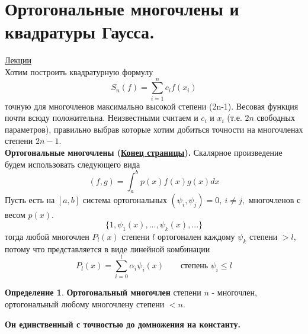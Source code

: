 \documentclass[specialist, subf, href, colorlinks=true, 12pt, times, mtpro, final]{disser}
\theoremstyle{definition}
\newtheorem{defn}{Определение}[section]
\begin{document}
\section {Ортогональные многочлены и квадратуры Гаусса.}
    \hyperlink {lects.40}{Лекции}\\
    Хотим построить квадратурную формулу
    $$
        S_n(f) = \sum\limits_{i = 1}^n c_i f(x_i)
    $$ 
    точную для многочленов максимально высокой степени (2n-1). Весовая функция почти всюду положительна. Неизвестными считаем и $c_i$ и  $x_i$ (т.е. $2n$ свободных параметров), правильно выбрав которые хотим добиться точности на многочленах степени $2n-1$. \\
    \textbf{Ортогональные многочлены (\hyperlink {lects.40}{Конец страницы}).}
    Скалярное произведение будем использовать следующего вида
    $$
        (f,g) = \int_a^b p(x)f(x)g(x) dx
    $$
    Пусть есть на $[a,b]$ система ортогональных $(\psi_i, \psi_j) = 0, \ i\ne j,$ многочленов с весом $p(x)$.
    $$
        \{1, \psi_1 (x), ..., \psi_k(x), ...\}
    $$
    тогда любой многочлен $P_l(x)$ степени $l$ ортогонален каждому $\psi_k$ степени $>l$, потому что представляется в виде линейной комбинации 
    $$
        P_l(x) = \sum\limits_{i = 0}^l \alpha_i \psi_i (x) \ \ \ \ \ \ \ \ \ \text{степень } \psi_i \le l
    $$
    \begin{defn}
        \textbf{Ортогональный многочлен} степени $n$ - многочлен, ортогональный любому многочлену степени $<n$.
    \end{defn}
    \noindent\textbf{Он единственный с точностью до домножения на константу.} \\
    
\end{document}
